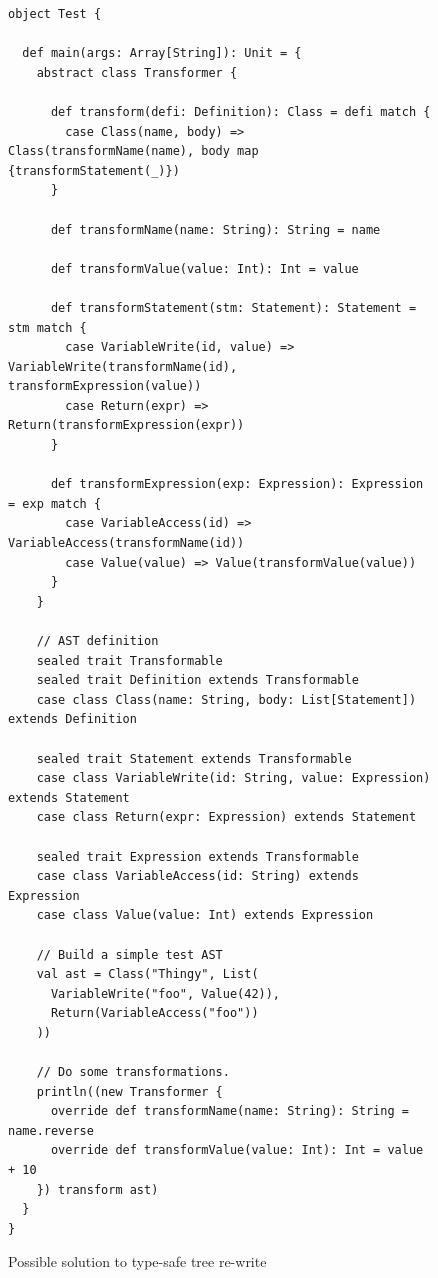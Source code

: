 \documentclass[11pt]{exam}
\begin{document}
\begin{figure}[b]
\begin{lstlisting}
object Test {

  def main(args: Array[String]): Unit = {
    abstract class Transformer {

      def transform(defi: Definition): Class = defi match {
        case Class(name, body) => Class(transformName(name), body map {transformStatement(_)})
      }

      def transformName(name: String): String = name

      def transformValue(value: Int): Int = value

      def transformStatement(stm: Statement): Statement = stm match {
        case VariableWrite(id, value) => VariableWrite(transformName(id), transformExpression(value))
        case Return(expr) => Return(transformExpression(expr))
      }

      def transformExpression(exp: Expression): Expression = exp match {
        case VariableAccess(id) => VariableAccess(transformName(id))
        case Value(value) => Value(transformValue(value))
      }
    }

    // AST definition
    sealed trait Transformable
    sealed trait Definition extends Transformable
    case class Class(name: String, body: List[Statement]) extends Definition

    sealed trait Statement extends Transformable
    case class VariableWrite(id: String, value: Expression) extends Statement
    case class Return(expr: Expression) extends Statement

    sealed trait Expression extends Transformable
    case class VariableAccess(id: String) extends Expression
    case class Value(value: Int) extends Expression

    // Build a simple test AST
    val ast = Class("Thingy", List(
      VariableWrite("foo", Value(42)),
      Return(VariableAccess("foo"))
    ))

    // Do some transformations.
    println((new Transformer {
      override def transformName(name: String): String = name.reverse
      override def transformValue(value: Int): Int = value + 10
    }) transform ast)
  }
}
\end{lstlisting}
  \caption{Possible solution to type-safe tree re-write}
  \label{transform_ast_scalac}
\end{figure}
\end{document}
